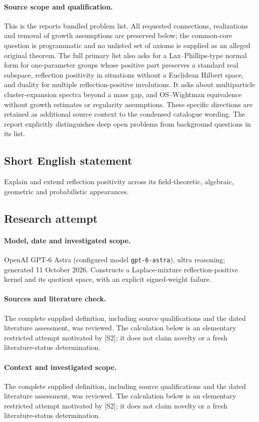 \documentclass[11pt]{article}
\begin{document}
\paragraph{Source scope and qualification.}
This is the report\textquotesingle s bundled problem list. All requested connections, realizations and removal of growth assumptions are preserved below; the common-core question is programmatic and no unlisted set of axioms is supplied as an alleged original theorem. The full primary list also asks for a Lax--Phillips-type normal form for one-parameter groups whose positive part preserves a standard real subspace, reflection positivity in situations without a Euclidean Hilbert space, and duality for multiple reflection-positive involutions. It asks about multiparticle cluster-expansion spectra beyond a mass gap, and OS--Wightman equivalence without growth estimates or regularity assumptions. These specific directions are retained as additional source context to the condensed catalogue wording. The report explicitly distinguishes deep open problems from background questions in its list.
\subsection{Short English statement}
Explain and extend reflection positivity across its field-theoretic, algebraic, geometric and probabilistic appearances.
\subsection{Research attempt}
\paragraph{Model, date and investigated scope.}
OpenAI GPT-6 Astra (configured model \texttt{gpt-6-astra}), ultra reasoning; generated 11 October 2026. Constructs a Laplace-mixture reflection-positive kernel and its quotient space, with an explicit signed-weight failure.

\paragraph{Sources and literature check.}
The complete supplied definition, including source qualifications and the dated literature assessment, was reviewed. The calculation below is an elementary restricted attempt motivated by [S2]; it does not claim novelty or a fresh literature-status determination.

\paragraph{Context and investigated scope.} The complete supplied definition, including source qualifications and the dated literature assessment, was reviewed. The calculation below is an elementary restricted attempt motivated by [S2]; it does not claim novelty or a fresh literature-status determination.
\end{document}
